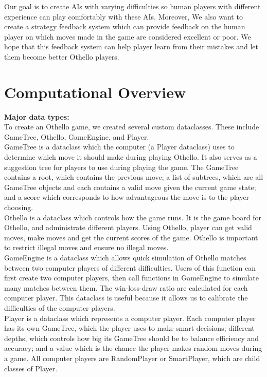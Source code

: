 \documentclass[fontsize=11pt]{article}
\begin{document}
Our goal is to create AIs with varying difficulties so human players with different experience can play comfortably with these AIs. Moreover, We also want to create a strategy feedback system which can provide feedback on the human player on which moves made in the game are considered excellent or poor. We hope that this feedback system can help player learn from their mistakes and let them become better Othello players.\\

\newpage
\section*{Computational Overview}

\textbf{Major data types:}\\

To create an Othello game, we created several custom dataclasses. These include GameTree, Othello, GameEngine, and Player.\\

GameTree is a dataclass which the computer (a Player dataclass) uses to determine which move it should make during playing Othello. It also serves as a suggestion tree for players to use during playing the game. The GameTree contains a root, which contains the previous move; a list of subtrees, which are all GameTree objects and each contains a valid move given the current game state; and a score which corresponds to how advantageous the move is to the player choosing. \\

Othello is a dataclass which controls how the game runs. It is the game board for Othello, and administrate different players. Using Othello, player can get valid moves, make moves and get the current scores of the game. Othello is important to restrict illegal moves and ensure no illegal moves.\\

GameEngine is a dataclass which allows quick simulation of Othello matches between two computer players of different difficulties. Users of this function can first create two computer players, then call functions in GameEngine to simulate many matches between them. The win-loss-draw ratio are calculated for each computer player. This dataclass is useful because it allows us to calibrate the difficulties of the computer players.\\

Player is a dataclass which represents a computer player. Each computer player has its own GameTree, which the player uses to make smart decisions; different depths, which controls how big its GameTree should be to balance efficiency and accuracy; and a value which is the chance the player makes random moves during a game. All computer players are RandomPlayer or SmartPlayer, which are child classes of Player.\\
\end{document}
